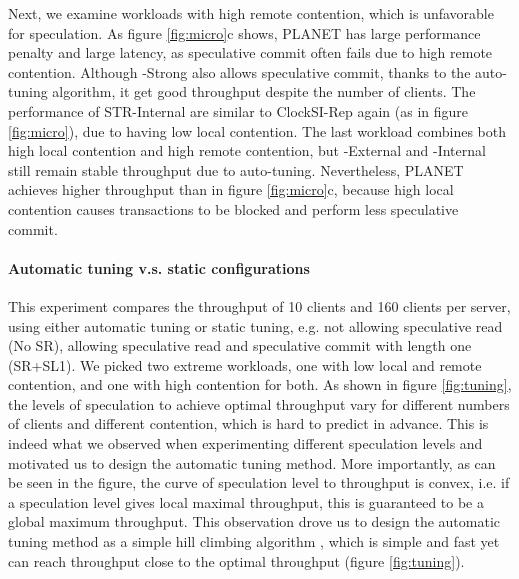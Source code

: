 Next, we examine workloads with high remote contention, which is unfavorable for speculation. As figure \ref{fig:micro}c shows, PLANET has large performance penalty and large latency, as speculative commit often fails due to high remote contention. Although {\specula}-Strong also allows speculative commit, thanks to the auto-tuning algorithm, it get good throughput despite the number of clients. The performance of STR-Internal are similar to ClockSI-Rep again (as in figure \ref{fig:micro}), due to having low local contention. The last workload combines both high local contention and high remote contention, but {\specula}-External and {\specula}-Internal still remain stable throughput due to auto-tuning. Nevertheless, PLANET achieves higher throughput than in figure \ref{fig:micro}c, because high local contention causes transactions to be blocked and perform less speculative commit.

\paragraph{Automatic tuning v.s. static configurations} This experiment compares the throughput of 10 clients and 160 clients per server, using either automatic tuning or static tuning, e.g. not allowing speculative read (No SR), allowing speculative read and speculative commit with length one (SR+SL1). We picked two extreme workloads, one with low local and remote contention, and one with high contention for both. As shown in figure \ref{fig:tuning}, the levels of speculation to achieve optimal throughput vary for different numbers of clients and different contention, which is hard to predict in advance. This is indeed what we observed when experimenting different speculation levels and motivated us to design the automatic tuning method. More importantly, as can be seen in the figure, the curve of speculation level to throughput is convex, i.e. if a speculation level gives local maximal throughput, this is guaranteed to be a global maximum throughput. This observation drove us to design the automatic tuning method as a simple hill climbing algorithm \cite{hillclimbing}, which is simple and fast yet can reach throughput close to the optimal throughput (figure \ref{fig:tuning}).

